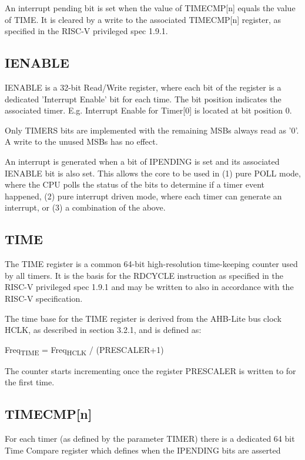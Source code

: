 An interrupt pending bit is set when the value of TIMECMP[n] equals
the value of TIME. It is cleared by a write to the associated
TIMECMP[n] register, as specified in the RISC-V privileged spec
1.9.1.

\subsection{IENABLE}\label{ienable}

IENABLE is a 32-bit Read/Write register, where each bit of the register
is a dedicated 'Interrupt Enable' bit for each time. The bit position
indicates the associated timer. E.g. Interrupt Enable for Timer[0]
is located at bit position 0.

Only TIMERS bits are implemented with the remaining MSBs always read as
'0'. A write to the unused MSBs has no effect.

An interrupt is generated when a bit of IPENDING is set and its
associated IENABLE bit is also set. This allows the core to be used in
(1) pure POLL mode, where the CPU polls the status of the bits to
determine if a timer event happened, (2) pure interrupt driven mode,
where each timer can generate an interrupt, or (3) a combination of the
above.

\subsection{TIME}\label{time}

The TIME register is a common 64-bit high-resolution time-keeping
counter used by all timers. It is the basis for the RDCYCLE instruction
as specified in the RISC-V privileged spec 1.9.1 and may be written to
also in accordance with the RISC-V specification.

The time base for the TIME register is derived from the AHB-Lite bus
clock HCLK, as described in section 3.2.1, and is defined as:

Freq\textsubscript{TIME} = Freq\textsubscript{HCLK} / (PRESCALER+1)

The counter starts incrementing once the register PRESCALER is written
to for the first time.

\subsection{TIMECMP[n]}\label{timecmpn}

For each timer (as defined by the parameter TIMER) there is a dedicated
64 bit Time Compare register which defines when the IPENDING bits are
asserted

